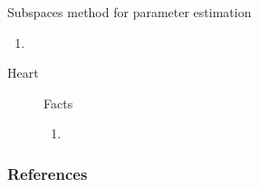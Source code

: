 \documentclass[t,12pt,english
\ifx\beamermode\undefined\else,\beamermode\fi
]{beamer}
\begin{document}
\begin{frame}{Subspaces method for parameter estimation}
 

\begin{block}{\footnotesize{}}\tiny{}
\begin{enumerate} 
\vspace{0.05cm}
     \item \tiny{\textbf{\textit{}}} 

     
\end{enumerate}
\end{block}
    
\end{frame}




\begin{frame}{Heart}


\begin{figure}[!htb]

\begin{block}{\footnotesize{Facts}}\tiny{}
\begin{enumerate} 
\vspace{0.05cm}
     \item \tiny{\textbf{\textit{}}} 

     
\end{enumerate}
\end{block}
     


\endminipage
{}
\centering


\endminipage
\end{figure}

\end{frame}












\begin{frame}[allowframebreaks]
        \frametitle{References}
        \nocite{*}
        
        
\end{frame}
\end{document}
